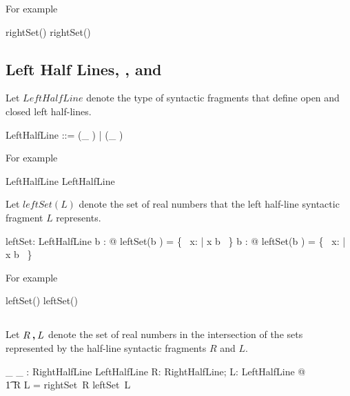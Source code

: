 \documentclass[11pt, oneside]{article}
\begin{document}
For example

\begin{zed}
	\zeroR \notin rightSet(\openLowerBound \zeroR)
\also
	\oneR \in rightSet(\closedLowerBound \oneR)
\end{zed}

\subsection{Left Half Lines, , and }

Let $LeftHalfLine$ denote the type of syntactic fragments that define open and closed left half-lines.

\begin{zed}
	LeftHalfLine ::= (\_ \openUpperBound)  \ldata \R \rdata | (\_ \closedUpperBound)  \ldata \R \rdata
\end{zed}

For example

\begin{zed}
	\zeroR \openUpperBound \in LeftHalfLine
\also
	\oneR \closedUpperBound \in LeftHalfLine
\end{zed}

Let $leftSet(L)$ denote the set of real numbers that the left half-line syntactic fragment $L$ represents.

\begin{axdef}
	leftSet: LeftHalfLine \fun \power \R
\where
	\forall b : \R @ leftSet(b \openUpperBound) = \{~ x: \R | x \ltR b ~\}
\also
	\forall b : \R @ leftSet(b \closedUpperBound) = \{~ x: \R | x \leR b ~\}
\end{axdef}

For example

\begin{zed}
	\zeroR \notin leftSet(\zeroR \openUpperBound)
\also
	\oneR \in leftSet(\oneR \closedUpperBound)
\end{zed}

\subsection{}

Let $R \mathbin{\boldsymbol{,}} L$ denote the set of real numbers in the intersection of the sets represented by
the half-line syntactic fragments $R$ and $L$.

\begin{axdef}
	\_ \intersectRightLeft \_ : RightHalfLine \cross LeftHalfLine \fun \power \R
\where
	\forall R: RightHalfLine; L: LeftHalfLine @ \\
	\t1	R \intersectRightLeft L = rightSet~R \cap leftSet~L
\end{axdef}
\end{document}
